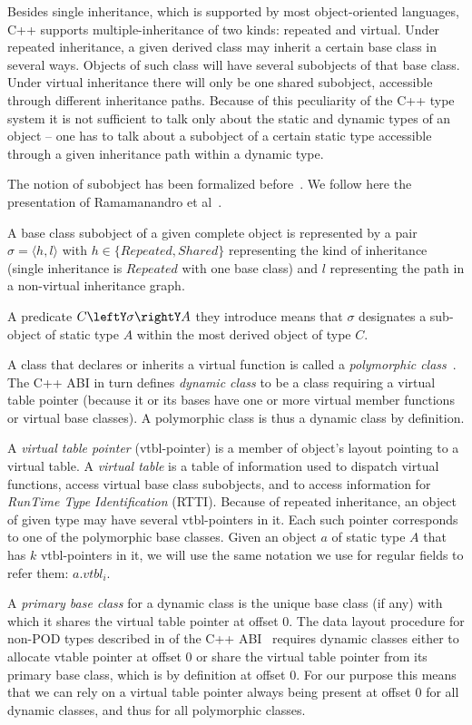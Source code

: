 Besides single inheritance, which is supported by most object-oriented languages, C++ 
supports multiple-inheritance of two kinds: repeated and virtual. Under repeated 
inheritance, a given derived class may inherit a certain base class in several ways. 
Objects of such class will have several subobjects of that base class. Under 
virtual inheritance there will only be one shared subobject, accessible through 
different inheritance paths. Because of this peculiarity of the C++ type system 
it is not sufficient to talk only about the static and dynamic types of an object -- 
one has to talk about a subobject of a certain static type accessible through a
given inheritance path within a dynamic type.

The notion of subobject has been formalized before~\cite{RF95,WNST06,RDL11}.
We follow here the presentation of Ramamanandro et al~\cite{RDL11}.

A base class subobject of a given complete object is represented by a pair 
$\sigma = \langle h,l\rangle$ with $h \in \{Repeated,Shared\}$ representing the 
kind of inheritance (single inheritance is $Repeated$ with one base class) and $l$ 
representing the path in a non-virtual inheritance graph.

A predicate $C\leftY\sigma\rightY A$ they introduce means that $\sigma$ 
designates a sub-object of static type $A$ within the most derived object of 
type $C$.

A class that declares or inherits a virtual function is called a 
\emph{polymorphic class}~\cite[]{C++0x}. The C++ ABI in turn defines 
\emph{dynamic class} to be a class requiring a virtual table pointer (because it 
or its bases have one or more virtual member functions or virtual base classes). 
A polymorphic class is thus a dynamic class by definition.

A \emph{virtual table pointer} (vtbl-pointer) is a member of object's layout 
pointing to a virtual table. A \emph{virtual table} is a table of information used 
to dispatch virtual functions, access virtual base class subobjects, and to 
access information for \emph{RunTime Type Identification} (RTTI). Because of repeated
inheritance, an object of given type may have several vtbl-pointers in it. Each 
such pointer corresponds to one of the polymorphic base classes. Given an object 
$a$ of static type $A$ that has $k$ vtbl-pointers in it, we will use the same 
notation we use for regular fields to refer them: $a.vtbl_i$.

A \emph{primary base class} for a dynamic class is the unique base class (if any) 
with which it shares the virtual table pointer at offset 0. The data layout 
procedure for non-POD types described in  of the C++ ABI~\cite{C++ABI} 
requires dynamic classes either to allocate vtable pointer at offset 0 or share 
the virtual table pointer from its primary base class, which is by definition at 
offset 0. For our purpose this means that we can rely on a virtual table pointer 
always being present at offset 0 for all dynamic classes, and thus for all polymorphic 
classes.

